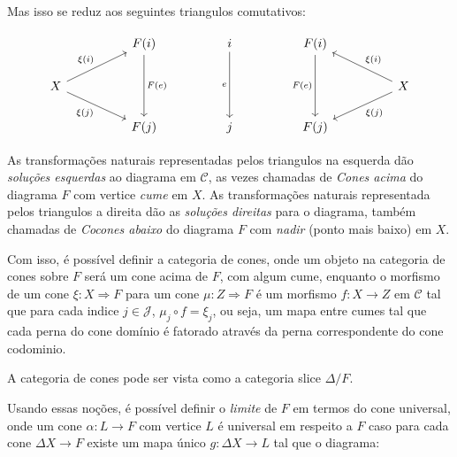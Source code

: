 \documentclass[../main.tex]{subfiles}
\begin{document}
Mas isso se reduz aos seguintes triangulos comutativos:

\[\begin{tikzcd}
	&& {F(i)} && i && {F(i)} \\
	X &&&&&&&& X \\
	&& {F(j)} && j && {F(j)}
	\arrow["{F(e)}", from=1-3, to=3-3]
	\arrow["e"', from=1-5, to=3-5]
	\arrow["{F(e)}"', from=1-7, to=3-7]
	\arrow["{\xi (i)}", from=2-1, to=1-3]
	\arrow["{\xi (j)}"', from=2-1, to=3-3]
	\arrow["{\xi(i)}"', from=2-9, to=1-7]
	\arrow["{\xi (j)}", from=2-9, to=3-7]
\end{tikzcd}\]


As transformações naturais representadas pelos triangulos na esquerda dão \emph{soluções esquerdas} ao diagrama em $\mathcal{C}$, as vezes chamadas de \emph{Cones acima} do diagrama $F$ com vertice \emph{cume} em $X$. As transformações naturais representada pelos triangulos a direita dão as \emph{soluções direitas} para o diagrama, também chamadas de \emph{Cocones abaixo} do diagrama $F$ com \emph{nadir} (ponto mais baixo) em $X$.

Com isso, é possível definir a categoria de cones, onde um objeto na categoria de cones sobre $F$ será um cone acima de $F$, com algum cume, enquanto o morfismo de um cone $\xi : X \Rightarrow F$ para um cone $\mu : Z \Rightarrow F$ é um morfismo $f : X \to Z$ em $\mathcal{C}$ tal que para cada indice $j \in \mathcal{J}$, $\mu_j \circ f = \xi_j$, ou seja, um mapa entre cumes tal que cada perna do cone domínio é fatorado através da perna correspondente do cone codominio.

A categoria de cones pode ser vista como a categoria slice $\Delta / F$.

Usando essas noções, é possível definir o \emph{limite} de $F$ em termos do cone universal, onde um cone $\alpha : L \to F$ com vertice $L$ é universal em respeito a $F$ caso para cada cone $\Delta X \to F$ existe um mapa único $g : \Delta X \to L$ tal que o diagrama:

\end{document}
